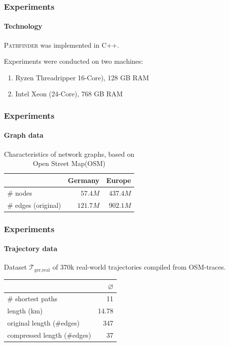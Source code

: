 \documentclass{beamer}
\newcommand{\pathfinder}{\textsc{Pathfinder}\xspace}
\newcommand{\traj}[2]{\mathcal{T}_{\text{#1},\text{#2}}}
\begin{document}
\begin{frame}
	\frametitle{Experiments}
	\framesubtitle{Technology}
	\pathfinder was implemented in C++. \pause
	\medskip

	Experiments were conducted on two machines: \pause
	\begin{enumerate}
		\item Ryzen Threadripper 16-Core), 128 GB RAM
		\item Intel Xeon (24-Core), 768 GB RAM
	\end{enumerate}
\end{frame}

\begin{frame}
	\frametitle{Experiments}
	\framesubtitle{Graph data}
	\begin{table}
		{
			\caption{Characteristics of network graphs, based on Open Street Map(OSM)}
			\begin{tabular}{|l|rr|}
				\hline
				                    & Germany  & Europe
				\\ \hline
				\# nodes            & $57.4M$  & $437.4M$ \\
				\# edges (original) & $121.7M$ & $902.1M$ \\
				\hline
			\end{tabular}
		}
	\end{table}
\end{frame}

\begin{frame}
	\frametitle{Experiments}
	\framesubtitle{Trajectory data}
	Dataset $\traj{ger}{real}$ of 370k real-world trajectories compiled from OSM-traces.
	\begin{table}
		{
			\begin{tabular}{|l|r|}
				\hline
				                            & $\varnothing$ \\
				\hline
				\# shortest paths           & 11            \\
				length (km)                 & 14.78         \\
				original length (\#edges)   & 347           \\
				compressed length (\#edges) & 37            \\
				\hline
			\end{tabular}
		}
	\end{table}
\end{frame}
\end{document}
